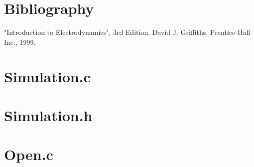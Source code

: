 \documentclass[twocolumn]{article}
\begin{document}
\onecolumn

\section{Bibliography}
"Introduction to Electrodynamics", 3rd Edition, David J. Griffiths, Prentice-Hall Inc., 1999. 

\appendix

\section{Simulation.c}
{\tiny {}}

\section{Simulation.h}
{\tiny {}}

\section{Open.c}
{\tiny {}}
\end{document}

